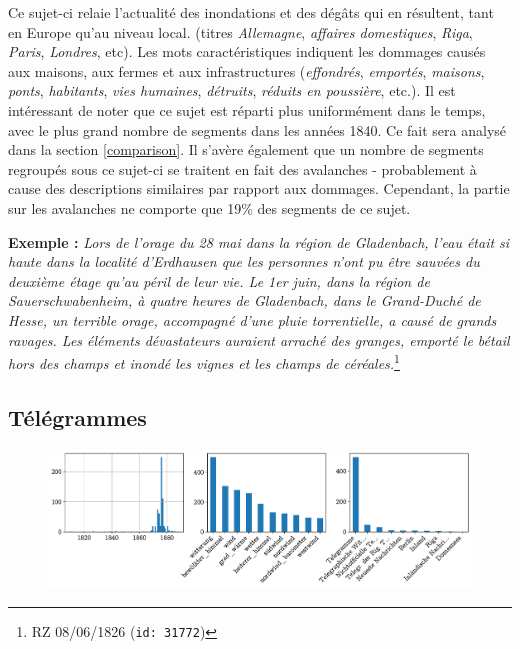 \documentclass[a4paper,twoside,12pt]{article}
\begin{document}
\noindent Ce sujet-ci relaie l'actualité des inondations et des dégâts qui en résultent, tant en Europe qu'au niveau local. (titres \textit{Allemagne}, \textit{affaires domestiques}, \textit{Riga}, \textit{Paris}, \textit{Londres}, etc). Les mots caractéristiques indiquent les dommages causés aux maisons, aux fermes et aux infrastructures (\textit{effondrés}, \textit{emportés}, \textit{maisons}, \textit{ponts}, \textit{habitants}, \textit{vies humaines}, \textit{détruits}, \textit{réduits en poussière}, etc.). Il est intéressant de noter que ce sujet est réparti plus uniformément dans le temps, avec le plus grand nombre de segments dans les années 1840. Ce fait sera analysé dans la section \ref{comparison}. Il s'avère également que un nombre de segments regroupés sous ce sujet-ci se traitent en fait des avalanches - probablement à cause des descriptions similaires par rapport aux dommages. Cependant, la partie sur les avalanches ne comporte que 19\% des segments de ce sujet.

\medskip

\noindent \textbf{Exemple :} \textit{Lors de l'orage du 28 mai dans la région de Gladenbach, l'eau était si haute dans la localité d'Erdhausen que les personnes n'ont pu être sauvées du deuxième étage qu'au péril de leur vie. Le 1er juin, dans la région de Sauerschwabenheim, à quatre heures de Gladenbach, dans le Grand-Duché de Hesse, un terrible orage, accompagné d'une pluie torrentielle, a causé de grands ravages. Les éléments dévastateurs auraient arraché des granges, emporté le bétail hors des champs et inondé les vignes et les champs de céréales.}\footnote{RZ 08/06/1826 (\texttt{id: 31772})}

\clearpage



\subsection{Télégrammes} \label{topic10_télégrammes}

\begin{figure}[H]
\centering
\includegraphics[width=\textwidth]{images/topic_charts_10.pdf}
\end{figure}
\end{document}

